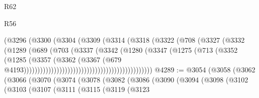 \begin{lexlean}{R62}
\begin{lexlean}{R56}
\begin{coremodule}
{{{{{{{{{{{{{{{{{{{{{{{{{{{{{{{{{{{{{{{{{{{{{{{{{{{{{{{{{{{{{{{{{{{{{{{{{{{{{{{{{{{{{{{{{{{{{{{{{{{{{{{{{{{{{{{{{{{{{{{{{{{{{{{{{{{{{{{{{{{{{{{{{{{{{{{{{{{{{{{{{{{{{{{{{{{{{{{{{{{{{{{{{{{{{{{{{{{{{{{{{{{{{{{{{{{                                                (@3296
                                                  (@3300
                                                    (@3304
                                                      (@3309
                                                        (@3314
                                                          (@3318
                                                            (@3322
                                                              (@708
                                                                (@3327
                                                                  (@3332
                                                                    (@1289
                                                                      (@689
                                                                        (@703
                                                                          (@3337
                                                                            (@3342
                                                                              (@1280
                                                                                (@3347
                                                                                  (@1275
                                                                                    (@713
                                                                                      (@3352
                                                                                        (@1285
                                                                                          (@3357
                                                                                            (@3362
                                                                                              (@3367
                                                                                                (@679
                                                                                                  @4193)))))))))))))))))))))))))))))))))))))))))))))))
@4289 := @3054
    (@3058
      (@3062
        (@3066
          (@3070
            (@3074
              (@3078
                (@3082
                  (@3086
                    (@3090
                      (@3094
                        (@3098
                          (@3102
                            (@3103
                              (@3107
                                (@3111
                                  (@3115
                                    (@3119
                                      (@3123
}}}}}}}}}}}}}}}}}}}}}}}}}}}}}}}}}}}}}}}}}}}}}}}}}}}}}}}}}}}}}}}}}}}}}}}}}}}}}}}}}}}}}}}}}}}}}}}}}}}}}}}}}}}}}}}}}}}}}}}}}}}}}}}}}}}}}}}}}}}}}}}}}}}}}}}}}}}}}}}}}}}}}}}}}}}}}}}}}}}}}}}}}}}}}}}}}}}}}}}}}}}}}}}}}}}
\end{coremodule}
\end{lexlean}
\end{lexlean}
